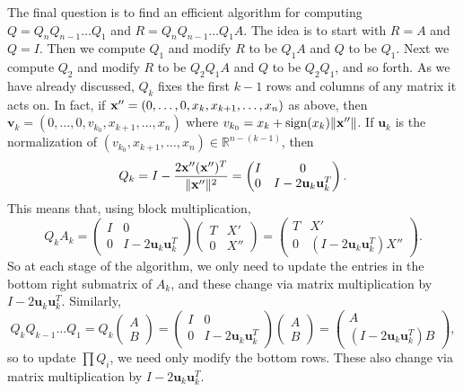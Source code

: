 The final question is to find an efficient algorithm for computing $Q = Q_nQ_{n-1} \ldots Q_1$ and $R = Q_nQ_{n-1} \ldots Q_1A$. 
The idea is to start with $R=A$ and $Q = I$. Then we compute $Q_1$ and modify $R$ to be $Q_1A$ and $Q$ to be $Q_1$. 
Next we compute $Q_2$ and modify $R$ to be $Q_2Q_1A$ and $Q$ to be $Q_2Q_1$, and so forth. 
As we have already discussed, $Q_k$ fixes the first $k-1$ rows and columns of any matrix it acts on. 
In fact, if ${\bf x}'' = (0, \ldots, 0, x_k, x_{k+1}, \ldots, x_n)$ as above, then $\mathbf{v}_k = (0, \ldots, 0, v_{k_0}, x_{k+1}, \ldots, x_n)$ where $v_{k_0} = x_k + \operatorname{sign}(x_k) \| {\bf x}'' \|$. 
If $\mathbf{u}_k$ is the normalization of $(v_{k_0}, x_{k+1}, \ldots, x_n) \in \mathbb{R}^{n-(k-1)}$, then
\[
Q_k = I-\frac{2{\bf x}''({\bf x}'')^T}{\|{\bf x}''\|^2} =  \begin{pmatrix}
I & 0 \\
0 & I-2\mathbf{u}_k\mathbf{u}_k^T
\end{pmatrix}.
\]
This means that, using block multiplication,
\[
Q_kA_k =  \begin{pmatrix}
I & 0 \\
0 & I-2\mathbf{u}_k\mathbf{u}_k^T
\end{pmatrix}\begin{pmatrix}
T & X' \\
0 & X''
\end{pmatrix} = \begin{pmatrix}
T & X' \\
0 & ( I-2\mathbf{u}_k\mathbf{u}_k^T)X''
\end{pmatrix}.
\]
So at each stage of the algorithm, we only need to update the entries in the bottom right submatrix of $A_k$, and these change via matrix multiplication by $ I-2\mathbf{u}_k\mathbf{u}_k^T$. Similarly,
\[
Q_kQ_{k-1}\ldots Q_1 = Q_k \begin{pmatrix}
A\\
B
\end{pmatrix} = \begin{pmatrix}
I & 0 \\
0 & I-2\mathbf{u}_k\mathbf{u}_k^T
\end{pmatrix}\begin{pmatrix}
A\\
B
\end{pmatrix} = \begin{pmatrix}
A\\
(I-2\mathbf{u}_k\mathbf{u}_k^T)B
\end{pmatrix},
\]
so to update $\prod Q_i$, we need only modify the bottom rows. 
These also change via matrix multiplication by $I-2\mathbf{u}_k\mathbf{u}_k^T$.

